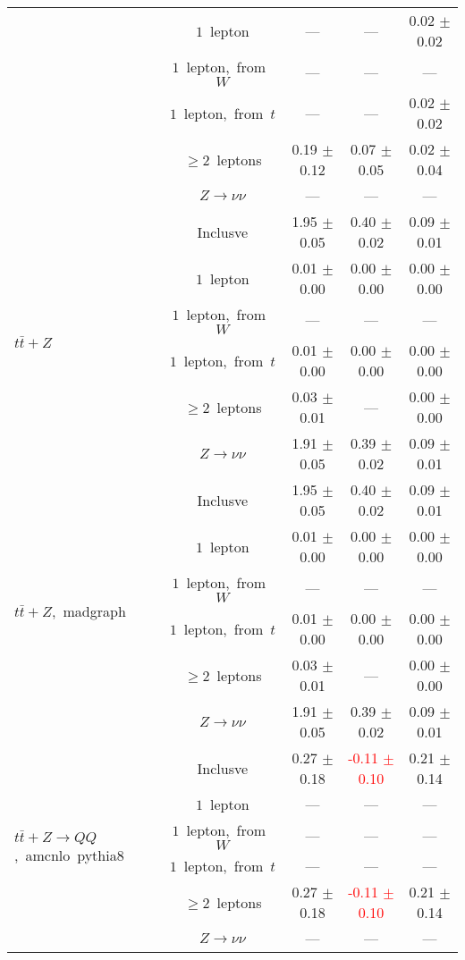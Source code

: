 \documentclass{article}
\begin{document}
\begin{longtable}{|l|c|c|c|c|}
 & $1$~lepton  & ---  & ---  & 0.02 $\pm$ 0.02 \\* 
 & $1$~lepton,~from~$W$  & ---  & ---  & --- \\* 
 & $1$~lepton,~from~$t$  & ---  & ---  & 0.02 $\pm$ 0.02 \\* 
 & $\ge2$~leptons  & 0.19 $\pm$ 0.12  & 0.07 $\pm$ 0.05  & 0.02 $\pm$ 0.04 \\* 
 & $Z\rightarrow\nu\nu$  & ---  & ---  & --- \\* 
\hline 
\multirow{6}{*}{$t\bar{t}+Z$} & Inclusve  & 1.95 $\pm$ 0.05  & 0.40 $\pm$ 0.02  & 0.09 $\pm$ 0.01 \\* 
 & $1$~lepton  & 0.01 $\pm$ 0.00  & 0.00 $\pm$ 0.00  & 0.00 $\pm$ 0.00 \\* 
 & $1$~lepton,~from~$W$  & ---  & ---  & --- \\* 
 & $1$~lepton,~from~$t$  & 0.01 $\pm$ 0.00  & 0.00 $\pm$ 0.00  & 0.00 $\pm$ 0.00 \\* 
 & $\ge2$~leptons  & 0.03 $\pm$ 0.01  & ---  & 0.00 $\pm$ 0.00 \\* 
 & $Z\rightarrow\nu\nu$  & 1.91 $\pm$ 0.05  & 0.39 $\pm$ 0.02  & 0.09 $\pm$ 0.01 \\* 
\hline 
\multirow{6}{*}{$t\bar{t}+Z$,~madgraph} & Inclusve  & 1.95 $\pm$ 0.05  & 0.40 $\pm$ 0.02  & 0.09 $\pm$ 0.01 \\* 
 & $1$~lepton  & 0.01 $\pm$ 0.00  & 0.00 $\pm$ 0.00  & 0.00 $\pm$ 0.00 \\* 
 & $1$~lepton,~from~$W$  & ---  & ---  & --- \\* 
 & $1$~lepton,~from~$t$  & 0.01 $\pm$ 0.00  & 0.00 $\pm$ 0.00  & 0.00 $\pm$ 0.00 \\* 
 & $\ge2$~leptons  & 0.03 $\pm$ 0.01  & ---  & 0.00 $\pm$ 0.00 \\* 
 & $Z\rightarrow\nu\nu$  & 1.91 $\pm$ 0.05  & 0.39 $\pm$ 0.02  & 0.09 $\pm$ 0.01 \\* 
\hline 
\multirow{6}{*}{$t\bar{t}+Z{\rightarrow}QQ$,~amcnlo~pythia8} & Inclusve  & 0.27 $\pm$ 0.18  & \textcolor{red}{ -0.11 $\pm$ 0.10 }  & 0.21 $\pm$ 0.14 \\* 
 & $1$~lepton  & ---  & ---  & --- \\* 
 & $1$~lepton,~from~$W$  & ---  & ---  & --- \\* 
 & $1$~lepton,~from~$t$  & ---  & ---  & --- \\* 
 & $\ge2$~leptons  & 0.27 $\pm$ 0.18  & \textcolor{red}{ -0.11 $\pm$ 0.10 }  & 0.21 $\pm$ 0.14 \\* 
 & $Z\rightarrow\nu\nu$  & ---  & ---  & --- \\* 

\end{longtable}
\end{document}
